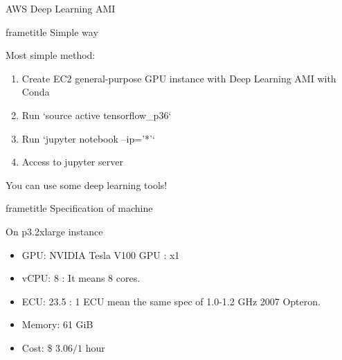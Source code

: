 \begin{frame}[plain,t]
  {AWS Deep Learning AMI}

  \begin{beamercolorbox}[rounded=true, center, shadow=true,wd=\linewidth]{frametitle}
    Simple way
  \end{beamercolorbox}
  Most simple method:

  \begin{enumerate}
    \item Create EC2 general-purpose GPU instance with Deep Learning AMI with Conda
    \item Run `source active tensorflow\_p36`
    \item Run `jupyter notebook --ip='*'`
    \item Access to jupyter server
  \end{enumerate}

  You can use some deep learning tools!

  \begin{beamercolorbox}[rounded=true, center, shadow=true,wd=\linewidth]{frametitle}
    Specification of machine
  \end{beamercolorbox}

  On p3.2xlarge instance
  \begin{itemize}
    \item GPU: NVIDIA Tesla V100 GPU : x1
    \item vCPU: 8 : It means 8 cores.
    \item ECU: 23.5 : 1 ECU mean the same spec of 1.0-1.2 GHz 2007 Opteron.
    \item Memory: 61 GiB
    \item Cost: \$ $3.06 / 1$ hour
  \end{itemize}
\end{frame}
